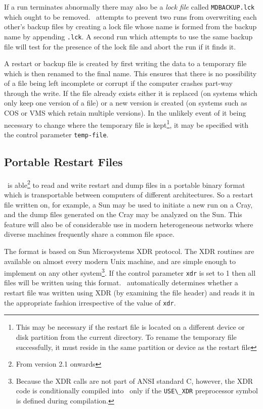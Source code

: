 If a run terminates abnormally there may also be a {\em lock file\/}
called \verb'MDBACKUP.lck' which ought to be removed.  \moldy\
attempts to prevent two runs from overwriting each other's backup
files by creating a lock file whose name is formed from the backup
name by appending \verb'.lck'.  A second run which attempts to use the
same backup file will test for the presence of the lock file and abort
the run if it finds it.

A restart or backup file is created by first writing the data to a
temporary file which is then renamed to the final name.  This ensures
that there is no possibility of a file being left incomplete or
corrupt if the computer crashes part-way through the write.  If the
file already exists either it is replaced (on systems which only keep
one version of a file) or a new version is created (on systems such as
COS or VMS which retain multiple versions).  In the unlikely event of
it being necessary to change where the temporary file is
kept\footnote{This may be necessary if the restart file is located on
a different device or disk partition from the current directory. To
rename the temporary file successfully, it must reside in the same
partition or device as the restart file}, it may be specified with the
control parameter
\verb'temp-file'.

\subsection{Portable Restart Files}
\label{sec:xdr}
\moldy\ is able\footnote{From version 2.1 onwards} to read and write
restart and dump files in a portable binary format which is
transportable between computers of different architectures.  So a
restart file written on, for example, a Sun may be used to initiate a
new run on a Cray, and the dump files generated on the Cray may be
analyzed on the Sun.  This feature will also be of considerable use in
modern heterogeneous networks where diverse machines frequently share
a common file space.

The format is based on Sun Microsystems XDR protocol\cite{sunxdr}.
The XDR routines are available on almost every modern Unix machine,
and are simple enough to implement on any other
system\footnote{Because the XDR calls are not part of ANSI standard C,
however, the XDR code is conditionally compiled into \moldy\ only if
the \verb'USE\_XDR' preprocessor symbol is defined during
compilation.}.  If the control parameter \verb'xdr' is set to 1 then
all files will be written using this format. \moldy\ automatically
determines whether a restart file was written using XDR (by examining
the file header) and reads it in the appropriate fashion irrespective
of the value of \verb'xdr'.

